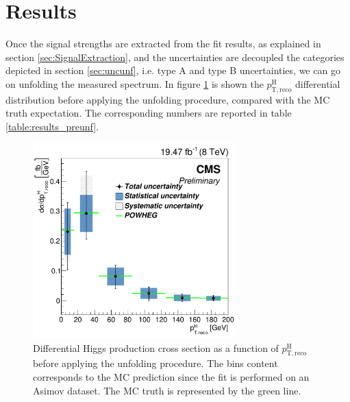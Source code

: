 \section{Results}
\label{sec:Results}

Once the signal strengths are extracted from the fit results, as explained in section \ref{sec:SignalExtraction}, and the uncertainties are decoupled the categories depicted in section \ref{sec:uncunf}, i.e. type A and type B uncertainties, we can go on unfolding the measured spectrum.
In figure \ref{fig:final_plot_preunf} is shown the $p_\mathrm{T, reco}^\mathrm{H}$ differential distribution before applying the unfolding procedure, compared with the MC truth expectation. The corresponding numbers are reported in table \ref{table:results_preunf}.

\begin{figure}[htb]
\centering
\includegraphics[width=0.7\textwidth]{images/plotsPreApp/preUnfolding.pdf}
\caption{Differential Higgs production cross section as a function of $p_\mathrm{T, reco}^\mathrm{H}$ before applying the unfolding procedure. The bins content corresponds to the MC prediction since the fit is performed on an Asimov dataset. The MC truth is represented by the green line.\label{fig:final_plot_preunf}}
\end{figure}

